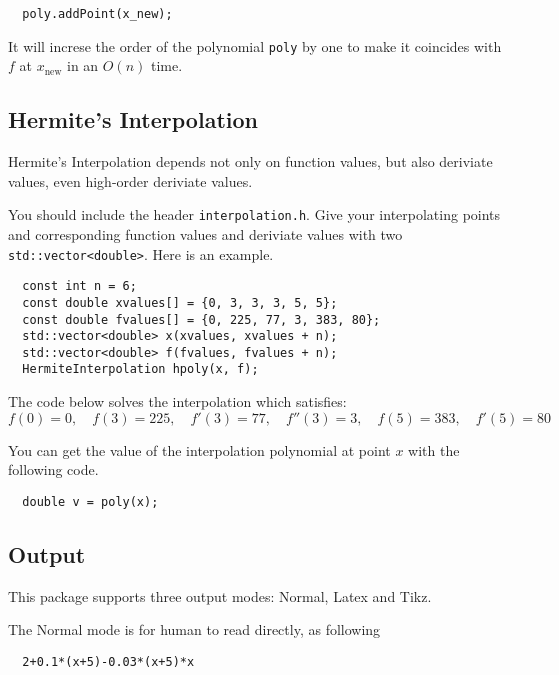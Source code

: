 \documentclass[11pt,en]{elegantpaper}
\begin{document}
\begin{lstlisting}
  poly.addPoint(x_new);
\end{lstlisting}

It will increse the order of the polynomial \verb|poly| by one to make it coincides with $f$ at $x_{\text{new}}$ in an $O(n)$ time.

\subsection{Hermite's Interpolation}

Hermite's Interpolation depends not only on function values, but also deriviate values, even high-order deriviate values.

You should include the header \verb|interpolation.h|. Give your interpolating points and corresponding function values and deriviate values with two \verb|std::vector<double>|. Here is an example.

\begin{lstlisting}
  const int n = 6;
  const double xvalues[] = {0, 3, 3, 3, 5, 5};
  const double fvalues[] = {0, 225, 77, 3, 383, 80};
  std::vector<double> x(xvalues, xvalues + n);
  std::vector<double> f(fvalues, fvalues + n);
  HermiteInterpolation hpoly(x, f);
\end{lstlisting}

The code below solves the interpolation which satisfies:
\begin{equation*}
  f(0)=0,\quad f(3)=225,\quad f'(3)=77,\quad f''(3)=3,\quad f(5)=383, \quad f'(5)=80
\end{equation*}

You can get the value of the interpolation polynomial at point $x$ with the following code.

\begin{lstlisting}
  double v = poly(x);
\end{lstlisting}

\subsection{Output}

This package supports three output modes: Normal, Latex and Tikz.

The Normal mode is for human to read directly, as following

\begin{lstlisting}
  2+0.1*(x+5)-0.03*(x+5)*x
\end{lstlisting}
\end{document}
